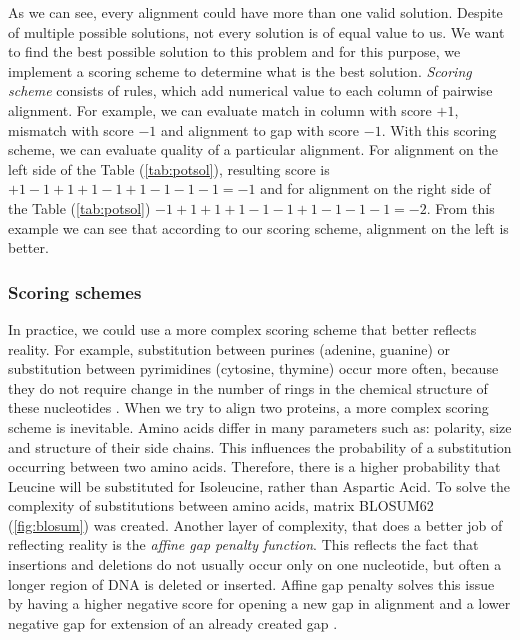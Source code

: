 As we can see, every alignment could have more than one valid solution.
Despite of multiple possible solutions, not every solution is of equal value to us.
We want to find the best possible solution to this problem and for this purpose, we implement a scoring scheme to determine what is the best solution.
\emph{Scoring scheme} consists of rules, which add numerical value to each column of pairwise alignment.
For example, we can evaluate match in column with score $+1$, mismatch with score $-1$ and alignment to gap with score $-1$.
With this scoring scheme, we can evaluate quality of a particular alignment.
For alignment on the left side of the Table (\ref{tab:potsol}), resulting score is $+1-1+1+1-1+1-1-1-1 = -1$ and for alignment on the right side of the Table (\ref{tab:potsol}) $-1+1+1+1-1-1+1-1-1-1 = -2$.
From this example we can see that according to our scoring scheme, alignment on the left is better.

\subsubsection{Scoring schemes}
In practice, we could use a more complex scoring scheme that better reflects reality.
For example, substitution between purines (adenine, guanine) or substitution between pyrimidines (cytosine, thymine) occur more often, because they do not require change in the number of rings in the chemical structure of these nucleotides \cite{}.
When we try to align two proteins, a more complex scoring scheme is inevitable.
Amino acids differ in many parameters such as: polarity, size and structure of their side chains.
This influences the probability of a substitution occurring between two amino acids.
Therefore, there is a higher probability that Leucine will be substituted for Isoleucine, rather than Aspartic Acid.
To solve the complexity of substitutions between amino acids, matrix BLOSUM62 (\ref{fig:blosum}) was created.
Another layer of complexity, that does a better job of reflecting reality is the \emph{affine gap penalty function}.
This reflects the fact that insertions and deletions do not usually occur only on one nucleotide, but often a longer region of DNA is deleted or inserted.
Affine gap penalty solves this issue by having a higher negative score for opening a new gap in alignment and a lower negative gap for extension of an already created gap \cite{}.

